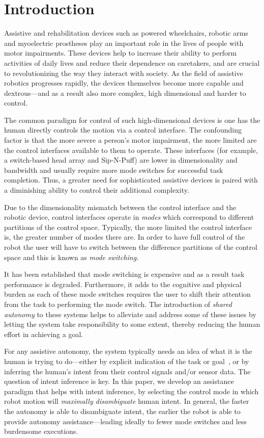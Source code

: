 \documentclass[conference]{IEEEtran}
\begin{document}
\IEEEpeerreviewmaketitle

\section{Introduction}

Assistive and rehabilitation devices such as powered wheelchairs, robotic arms and myoelectric prostheses play an important role in the lives of people with motor impairments. These devices help to increase their ability to perform activities of daily lives and reduce their dependence on caretakers, and are crucial to revolutionizing the way they interact with society. As the field of assistive robotics progresses rapidly, the devices themselves become more capable and dextrous---and as a result also more complex, high dimensional and harder to control. 

The common paradigm for control of such high-dimensional devices is one has the human directly controls the motion via a control interface. The confounding factor is that the more severe a person's motor impairment, the more limited are the control interfaces available to them to operate. These interfaces (for example,  a switch-based head array and Sip-N-Puff) are lower in dimensionality and bandwidth and usually require more mode switches for successful task completion. Thus, a greater need for sophisticated assistive devices is paired with a diminishing ability to control their additional complexity. 

Due to the dimensionality mismatch between the control interface and the robotic device, control interfaces operate in \textit{modes} which correspond to different partitions of the control space. Typically, the more limited the control interface is, the greater number of modes there are. In order to have full control of the robot the user will have to switch between the difference partitions of the control space and this is known as \textit{mode switching}. 

It has been established that mode switching is expensive and as a result task performance is degraded. Furthermore, it adds to the cognitive and physical burden as each of these mode switches requires the user to shift their attention from the task to performing the mode switch. The introduction of \textit{shared autonomy} to these systems helps to alleviate and address some of these issues by letting the system take responsibility to some extent, thereby reducing the human effort in achieving a goal. 

For any assistive autonomy, the system typically needs an idea of what it is the human is trying to do---either by explicit indication of the task or goal~\cite{choi2008laser}, or by inferring the human's intent from their control signals and/or sensor data. The question of intent inference is key. In this paper, we develop an assistance paradigm that helps with intent inference, by selecting the control mode in which robot motion will \textit{maximally  disambiguate} human intent. In general, the faster the autonomy is able to disambiguate intent, the earlier the robot is able to provide autonomy assistance---leading ideally to fewer mode switches and less burdensome executions. 
\end{document}
